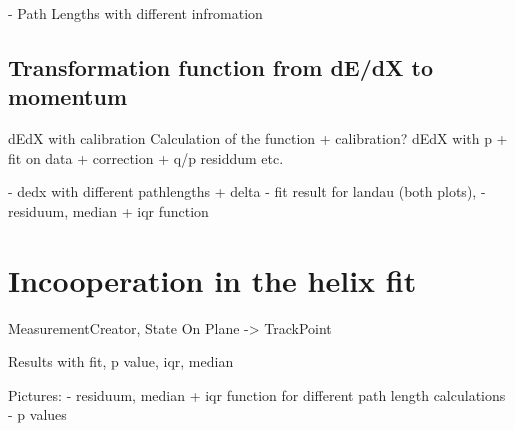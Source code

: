 - Path Lengths with different infromation

\subsection{Transformation function from dE/dX to momentum}

dEdX with calibration
Calculation of the function + calibration?
dEdX with p + fit on data + correction + q/p residdum etc.

- dedx with different pathlengths + delta
- fit result for landau (both plots),
- residuum, median + iqr function

\section{Incooperation in the helix fit}

MeasurementCreator, State On Plane -> TrackPoint

Results with fit, p value, iqr, median

Pictures:
- residuum, median + iqr function for different path length calculations
- p values